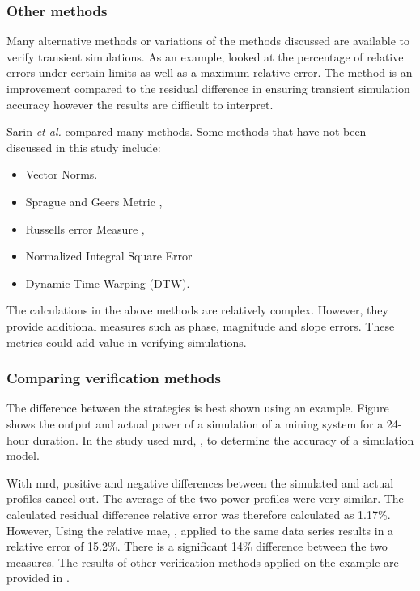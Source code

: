  		\subsubsection{Other methods}
 		Many alternative methods or variations of the methods discussed are available to verify transient simulations. As an example, \cite{arndt2007integrated} looked at the percentage of relative errors under certain limits as well as a maximum relative error. The method is an improvement compared to the residual difference in ensuring transient simulation accuracy however the results are difficult to interpret.
 		\par
 		Sarin \textit{et al.} \cite{sarin2010comparing} compared many methods. Some methods that have not been discussed in this study include:
 		\begin{itemize}
 			\item Vector Norms.
 			\item Sprague and Geers Metric \cite{Geers1984Objective}, \cite{Sprague2004Spectral}
 			\item Russells error Measure \cite{Russell1}, \cite{Russell2}
 			\item Normalized Integral Square Error
 			\item Dynamic Time Warping (DTW).
 		\end{itemize}
 		The calculations in the above methods are relatively complex. However, they provide additional measures such as phase, magnitude and slope errors. These metrics could add value in verifying simulations.
 		\subsubsection{Comparing verification methods}
 		The difference between the strategies is best shown using an example. Figure  shows the output and actual power of a simulation of a mining system for a 24-hour duration. In the study \cite{Mare2016PhD} used \gls{mrd}, , to determine the accuracy of a simulation model.
 		\par 
 		 With \gls{mrd}, positive and negative differences between the simulated and actual profiles cancel out. The average of the two power profiles were very similar. The calculated residual difference relative error was therefore calculated as 1.17\%. However, Using the relative \gls{mae}, , applied to the same data series results in a relative error of 15.2\%. There is a significant 14\% difference between the two measures. The results of other verification methods applied on the example are provided in . 
 		
